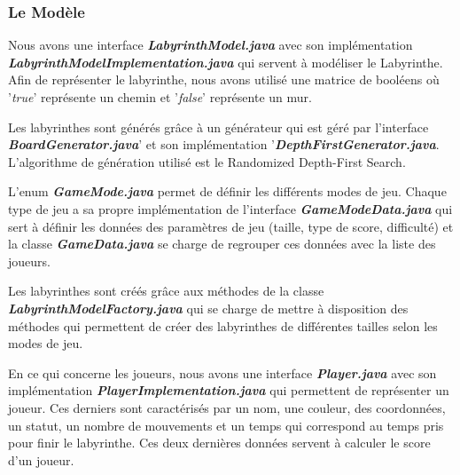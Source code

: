 \subsubsection{Le Modèle}
\label{subsubsec:modele}

Nous avons une interface \textbf{\textit{LabyrinthModel.java}} avec son implémentation
\textbf{\textit{LabyrinthModelImplementation.java}} qui servent à modéliser le Labyrinthe.
Afin de représenter le labyrinthe, nous avons utilisé une matrice de booléens
où '\textit{true}' représente un chemin et '\textit{false}' représente un mur.

Les labyrinthes sont générés grâce à un générateur qui est géré par
l'interface \textbf{\textit{BoardGenerator.java}}' et son implémentation '\textbf{\textit{DepthFirstGenerator.java}}.
L'algorithme de génération utilisé est le Randomized Depth-First Search.

L'enum \textbf{\textit{GameMode.java}} permet de définir les différents modes de jeu.
Chaque type de jeu a sa propre implémentation de l'interface \textbf{\textit{GameModeData.java}}
qui sert à définir les données des paramètres de jeu
(taille, type de score, difficulté) et la classe \textbf{\textit{GameData.java}} se charge de
regrouper ces données avec la liste des joueurs.

Les labyrinthes sont créés grâce aux méthodes de la classe
\textbf{\textit{LabyrinthModelFactory.java}} qui se charge de mettre à disposition des méthodes
qui permettent de créer des labyrinthes de différentes tailles selon les modes
de jeu.

En ce qui concerne les joueurs, nous avons une interface \textbf{\textit{Player.java}} avec son
implémentation \textbf{\textit{PlayerImplementation.java}} qui permettent de représenter un
joueur. Ces derniers sont caractérisés par un nom, une couleur, des coordonnées, un
statut, un nombre de mouvements et un temps qui correspond au temps pris pour finir le labyrinthe.
Ces deux dernières données servent à calculer le score d'un joueur.

